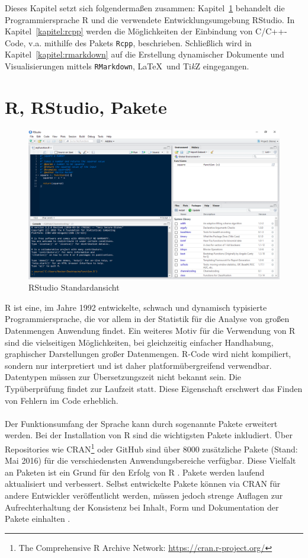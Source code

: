 Dieses Kapitel setzt sich folgendermaßen zusammen: Kapitel~\ref{kapitel:R} behandelt die Programmiersprache R und die verwendete Entwicklungsumgebung RStudio. In Kapitel~\ref{kapitel:rcpp} werden die Möglichkeiten der Einbindung von C/C++-Code, v.a. mithilfe des Pakets \texttt{Rcpp}, beschrieben. Schließlich wird in Kapitel~\ref{kapitel:rmarkdown} auf die Erstellung dynamischer Dokumente und Visualisierungen mittels \texttt{RMarkdown}, \LaTeX\ und Ti\textit{k}Z eingegangen.
\section{R, RStudio, Pakete}
\label{kapitel:R}
\begin{figure}[t]
\centering
\includegraphics[width=\ScaleIfNeeded]{abbildungen/rstudio}
\caption{RStudio Standardansicht}
\label{abb:rstudio}
\end{figure}
R ist eine, im Jahre 1992 entwickelte, schwach und dynamisch typisierte Programmiersprache, die vor allem in der Statistik für die Analyse von großen Datenmengen Anwendung findet. Ein weiteres Motiv für die Verwendung von R sind die vielseitigen Möglichkeiten, bei gleichzeitig einfacher Handhabung, graphischer Darstellungen großer Datenmengen. R-Code wird nicht kompiliert, sondern nur interpretiert und ist daher platformübergreifend verwendbar. Datentypen müssen zur Übersetzungszeit nicht bekannt sein. Die Typüberprüfung findet zur Laufzeit statt. Diese Eigenschaft erschwert das Finden von Fehlern im Code erheblich.
\\
\\
Der Funktionsumfang der Sprache kann durch sogenannte Pakete erweitert werden. Bei der Installation von R sind die wichtigsten Pakete inkludiert. Über Repositories wie CRAN\footnote{The Comprehensive R Archive Network: \url{https://cran.r-project.org/}} oder GitHub sind über 8000 zusätzliche Pakete (Stand: Mai 2016) für die verschiedensten Anwendungsbereiche verfügbar. Diese Vielfalt an Paketen ist ein Grund für den Erfolg von R \cite{wickham2015r}. Pakete werden laufend aktualisiert und verbessert. Selbst entwickelte Pakete können via CRAN für andere Entwickler veröffentlicht werden, müssen jedoch strenge Auflagen zur Aufrechterhaltung der Konsistenz bei Inhalt, Form und Dokumentation der Pakete einhalten \cite{rmanual}.  
